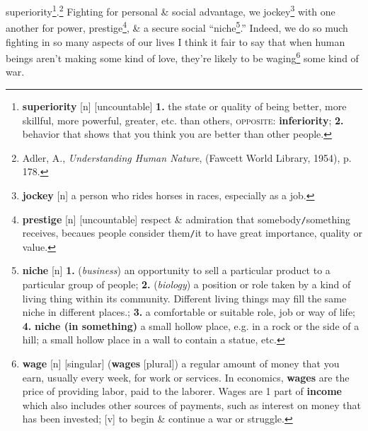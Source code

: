 \documentclass[oneside]{book}
\numberwithin{equation}{section}
\begin{document}
superiority\footnote{\textbf{superiority} [n] [uncountable] \textbf{1.} the state or quality of being better, more skillful, more powerful, greater, etc. than others, \textsc{opposite}: \textbf{inferiority}; \textbf{2.} behavior that shows that you think you are better than other people.}.\footnote{Adler, A., \textit{Understanding Human Nature}, (Fawcett World Library, 1954), p. 178.} Fighting for personal \& social advantage, we jockey\footnote{\textbf{jockey} [n] a person who rides horses in races, especially as a job.} with one another for power, prestige\footnote{\textbf{prestige} [n] [uncountable] respect \& admiration that somebody\texttt{/}something receives, becaues people consider them\texttt{/}it to have great importance, quality or value.}, \& a secure social ``niche\footnote{\textbf{niche} [n] \textbf{1.} (\textit{business}) an opportunity to sell a particular product to a particular group of people; \textbf{2.} (\textit{biology}) a position or role taken by a kind of living thing within its community. Different living things may fill the same niche in different places.; \textbf{3.} a comfortable or suitable role, job or way of life; \textbf{4.} \textbf{niche (in something)} a small hollow place, e.g. in a rock or the side of a hill; a small hollow place in a wall to contain a statue, etc.}.'' Indeed, we do so much fighting in so many aspects of our lives I think it fair to say that when human beings aren't making some kind of love, they're likely to be waging\footnote{\textbf{wage} [n] [singular] (\textbf{wages} [plural]) a regular amount of money that you earn, usually every week, for work or services. In economics, \textbf{wages} are the price of providing labor, paid to the laborer. Wages are 1 part of \textbf{income} which also includes other sources of payments, such as interest on money that has been invested; [v] to begin \& continue a war or struggle.} some kind of war.
\end{document}
